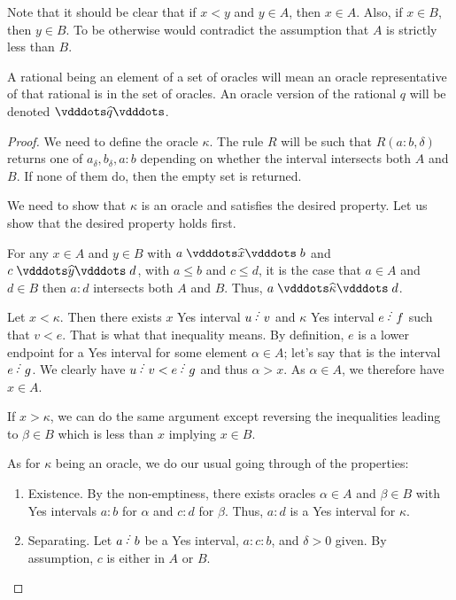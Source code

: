 \documentclass[12pt]{article}
\begin{document}
Note that it should be clear that if $x < y$ and $y \in A$, then $x  \in A$. Also, if $x \in B$, then $y \in B$. To be otherwise would contradict the assumption that $A$ is strictly less than $B$. 

A rational being an element of a set of oracles will mean an oracle representative of that rational is in the set of oracles. An oracle version of the rational $q$ will be denoted $\xora[q]$.

\begin{proof}
    We need to define the oracle $\kappa$. The rule $R$ will be such that $R(a:b, \delta)$ returns one of $a_\delta, b_\delta, a:b$ depending on whether the interval intersects both $A$ and $B$. If none of them do, then the empty set is returned. 

    We need to show that $\kappa$ is an oracle and satisfies the desired property. Let us show that the desired property holds first. 


    For any $x \in A$ and $y \in B$ with $a \xora b$  and $c \xora[y] d$, with $a \leq b$ and $c \leq d$, it is the case that $a \in A$ and $d \in B$ then $a:d$ intersects both $A$ and $B$. Thus, $a \xora[\kappa] d$. 

    Let $ x < \kappa$. Then there exists $x$ Yes interval $u\lte v$ and $\kappa$ Yes interval $e\lte f$ such that $v < e$. That is what that inequality means. By definition, $e$ is a lower endpoint for a Yes interval for some element $\alpha \in A$; let's say that is the interval $e\lte g$. We clearly have $ u \lte v < e \lte g$ and thus $\alpha > x$. As $\alpha \in A$, we therefore have $x \in A$. 

    If $x > \kappa$, we can do the same argument except reversing the inequalities leading to $\beta \in B$ which is less than $x$ implying $x \in B$.

    As for $\kappa$ being an oracle, we do our usual going through of the properties: 
    \begin{enumerate}
        \item Existence. By the non-emptiness, there exists oracles $\alpha \in A$ and $\beta \in B$ with Yes intervals $a:b$ for $\alpha$ and $c:d$ for $\beta$. Thus, $a:d$ is a Yes interval for $\kappa$. 
        \item Separating. Let $a\lte b$ be a Yes interval, $a:c:b$, and $\delta >0 $ given.  By assumption, $c$ is either in $A$ or $B$. 
        

\end{enumerate}
\end{proof}
\end{document}

